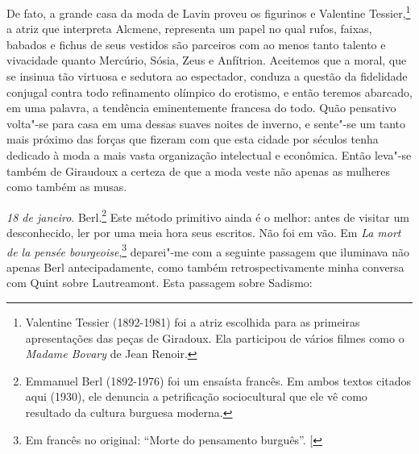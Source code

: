De fato, a grande casa da moda de Lavin proveu os figurinos e Valentine
Tessier,\footnote{Valentine Tessier (1892-1981) foi a atriz
  escolhida para as primeiras apresentações das peças de Giradoux. Ela
  participou de vários filmes como o \emph{Madame Bovary} de Jean
  Renoir. \versal{[N. E.]}} a atriz que interpreta Alcmene, representa um papel no qual
rufos, faixas, babados e fichus de seus vestidos são parceiros com ao
menos tanto talento e vivacidade quanto Mercúrio, Sósia, Zeus e
Anfítrion. Aceitemos que a moral, que se insinua tão virtuosa e sedutora
ao espectador, conduza a questão da fidelidade conjugal contra todo
refinamento olímpico do erotismo, e então teremos abarcado, em uma
palavra, a tendência eminentemente francesa do todo. Quão pensativo volta"-se
para casa em uma dessas suaves noites de inverno, e sente"-se um
tanto mais próximo das forças que fizeram com que esta cidade por
séculos tenha dedicado à moda a mais vasta organização intelectual e
econômica. Então leva"-se também de Giraudoux a certeza de que a moda
veste não apenas as mulheres como também as musas.

\emph{18 de janeiro}. Berl.\footnote{Emmanuel Berl (1892-1976) foi um
  ensaísta francês. Em ambos textos citados aqui (1930), ele denuncia a
  petrificação sociocultural que ele vê como resultado da cultura
  burguesa moderna. \versal{[N. E.]}} Este método primitivo ainda é o melhor: antes de
visitar um desconhecido, ler por uma meia hora seus escritos. Não foi em
vão. Em \emph{La mort de la pensée bourgeoise},\footnote{Em francês no original: ``Morte do pensamento burguês''. {[}\versal{N. T}{]}} deparei"-me com a seguinte
passagem que iluminava não apenas Berl antecipadamente, como também
retrospectivamente minha conversa com Quint sobre Lautreamont. Esta
passagem sobre Sadismo:

